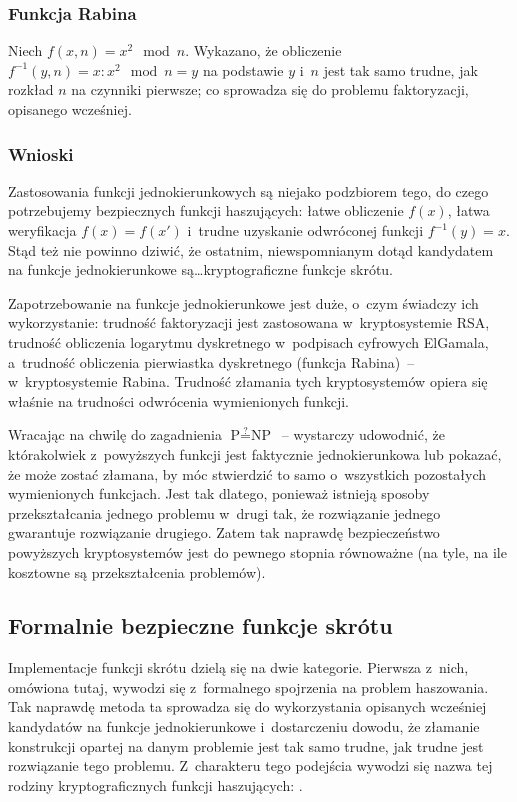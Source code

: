 \documentclass[12pt,a4paper,twoside]{article}
\begin{document}
\subsubsection{Funkcja Rabina}
Niech $f(x,n) = x^2 \mod n$. Wykazano, że obliczenie $f^{-1}(y,n) = x : x^2
\mod n = y$ na podstawie $y$ i~$n$ jest tak samo trudne, jak rozkład $n$ na
czynniki pierwsze; co sprowadza się do problemu faktoryzacji, opisanego
wcześniej.



\subsubsection{Wnioski}
Zastosowania funkcji jednokierunkowych są niejako podzbiorem tego, do czego
potrzebujemy bezpiecznych funkcji haszujących: łatwe obliczenie $f(x)$, łatwa
weryfikacja $f(x)=f(x')$ i~trudne uzyskanie odwróconej funkcji $f^{-1}(y)=x$.
Stąd też nie powinno dziwić, że ostatnim, niewspomnianym dotąd kandydatem na
funkcje jednokierunkowe są\ldots kryptograficzne funkcje skrótu.

Zapotrzebowanie na funkcje jednokierunkowe jest duże, o~czym świadczy ich
wykorzystanie: trudność faktoryzacji jest zastosowana w~kryptosystemie RSA,
trudność obliczenia logarytmu dyskretnego w~podpisach cyfrowych ElGamala,
a~trudność obliczenia pierwiastka dyskretnego (funkcja Rabina)~--
w~kryptosystemie Rabina. Trudność złamania tych kryptosystemów opiera się
właśnie na trudności odwrócenia wymienionych funkcji.

Wracając na chwilę do zagadnienia $\textrm{P} \stackrel{?}{=} \textrm{NP}$~--
wystarczy udowodnić, że którakolwiek z~powyższych funkcji jest faktycznie
jednokierunkowa lub pokazać, że może zostać złamana, by móc stwierdzić to samo
o~wszystkich pozostałych wymienionych funkcjach. Jest tak dlatego, ponieważ
istnieją sposoby przekształcania jednego problemu w~drugi tak, że rozwiązanie
jednego gwarantuje rozwiązanie drugiego. Zatem tak naprawdę bezpieczeństwo
powyższych kryptosystemów jest do pewnego stopnia równoważne (na tyle, na ile
kosztowne są przekształcenia problemów).



\subsection{Formalnie bezpieczne funkcje skrótu}
Implementacje funkcji skrótu dzielą się na dwie kategorie. Pierwsza z~nich,
omówiona tutaj, wywodzi się z~formalnego spojrzenia na problem haszowania. Tak
naprawdę metoda ta sprowadza się do wykorzystania opisanych wcześniej
kandydatów na funkcje jednokierunkowe i~dostarczeniu dowodu, że złamanie
konstrukcji opartej na danym problemie jest tak samo trudne, jak trudne jest
rozwiązanie tego problemu. Z~charakteru tego podejścia wywodzi się nazwa tej
rodziny kryptograficznych funkcji haszujących: .
\end{document}
